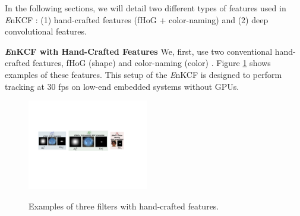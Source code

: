\documentclass[10pt,twocolumn,letterpaper]{article}
\begin{document}

In the following sections, we will detail two different types of
features used in {\it E}nKCF : (1) hand-crafted features (fHoG +
color-naming) and (2) deep convolutional features.

\textbf{{\it E}nKCF with Hand-Crafted Features} We, first, use two
conventional hand-crafted features, fHoG (shape)
\cite{felzenszwalb2010object} and color-naming (color)
\cite{li2014scale}. Figure \ref{fig:Filters} shows examples of these
features. This setup of the {\it E}nKCF is designed to perform
tracking at $30$ fps on low-end embedded systems without GPUs.
\begin{figure}[!h]
\centering
\includegraphics[width=0.47\textwidth]{./figures/Filters_Details.pdf}
   \\[-3ex]
\label{fig:Rt_S}
\quad{}\label{fig:Rt_L}
\quad\quad{}\label{fig:Rs}
\caption{Examples of three filters with hand-crafted features.}
\label{fig:Filters}
\end{figure}
\end{document}
